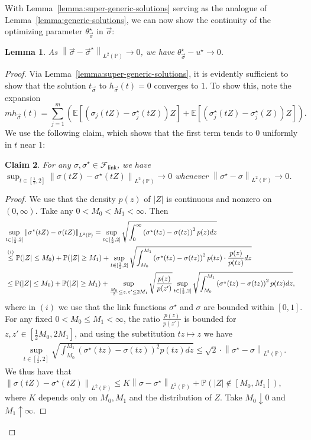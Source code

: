 \documentclass[11pt]{article}
\newcommand{\E}{\mathbb{E}}
\newcommand{\Prb}{\mathbb{P}}
\renewcommand{\P}{\mathbb{P}}
\newcommand{\prn}[1]{\left({#1}\right)} %
\newcommand{\norm}[1]{\left\|{#1}\right\|} %
\newcommand{\Flink}{\mathcal{F}_{\mathsf{link}}}
\newcommand{\<}{\langle} %
\renewcommand{\>}{\rangle}
\newcommand{\LtwoP}[1]{\norm{#1}_{L^2(\Prb)}}
\newcommand{\half}{\frac{1}{2}}
\newcommand{\opt}{^\star}
\newtheorem{claim}{Claim}[section]
\newtheorem{lemma}[claim]{Lemma}
\begin{document}
With Lemma~\ref{lemma:super-generic-solutions} serving as the analogue
of Lemma~\ref{lemma:generic-solutions}, we can now show
the continuity of the optimizing parameter $\theta\opt_{\vec{\sigma}}$
in $\vec{\sigma}$:
\begin{lemma}
	\label{lemma:vec-sigma-theta-continuity}
	As $\LtwoP{\vec{\sigma} - \vec{\sigma}\opt} \to 0$,
	we have $\theta\opt_{\vec{\sigma}} - u\opt \to 0$.
\end{lemma}
\begin{proof}
	Via Lemma~\ref{lemma:super-generic-solutions}, it is evidently
	sufficient to show that the solution $t_{\vec{\sigma}}$ to
	$h_{\vec{\sigma}}(t) = 0$ converges to $1$.
	To show this,
	note the expansion
	\begin{equation}
		\label{eqn:expand-h-m}
		m h_{\vec{\sigma}}(t) =
		\sum_{j = 1}^m \left(\E[(\sigma_j(tZ) - \sigma_j\opt(tZ)) Z]
		+ \E[(\sigma_j\opt(tZ) - \sigma_j\opt(Z))Z]
		\right).
	\end{equation}
	We use the following claim, which shows that
	the first term tends to 0 uniformly in $t$ near $1$:
	\begin{claim}
		\label{claim:taco}
		For any $\sigma, \sigma\opt \in \Flink$, we have
		$\sup_{t \in [\half,2]} \LtwoP{\sigma(tZ) - \sigma\opt(tZ)}
		\to 0$ whenever $\LtwoP{\sigma\opt - \sigma} \to 0$.
	\end{claim}
	\begin{proof}
		We use that the density $p(z)$ of $|Z|$ is continuous
		and nonzero on $(0, \infty)$. Take any $0 < M_0 < M_1 < \infty$.
		Then
		\begin{align*}
			\lefteqn{\sup_{t \in [\half, 2]}
				\LtwoP{\sigma\opt(tZ) - \sigma(tZ)}
				=  \sup_{t \in [\half, 2]} \sqrt{\int_0^\infty \prn{\sigma\opt(tz) - \sigma(tz)}^2 p(z) dz}} \\
			& \stackrel{(i)}{\leq}
			\Prb(|Z| \leq M_0) + \Prb(|Z| \geq M_1) +
			\sup_{t \in [\half, 2]} \sqrt{\int_{M_0}^{M_1}
				\prn{\sigma\opt(tz) - \sigma(tz)}^2 p(tz) \cdot
				\frac{p(z)}{p(tz)} dz} \nonumber \\
			& \leq \Prb(|Z| \leq M_0) + \Prb(|Z| \geq M_1) + \sup_{
				\frac{M_0}{2} \le z, z'
				\le 2 M_1}
			\sqrt{\frac{p(z)}{p(z')}}
			\sup_{t \in [\half, 2]} \sqrt{\int_{M_0}^{M_1}
				\prn{\sigma\opt(tz) - \sigma(tz)}^2 p(tz) dz}  ,
		\end{align*}
		where in $(i)$ we use that the link functions $\sigma\opt$ and $\sigma$
		are bounded within $[0,1]$. For any fixed $0 < M_0 \le M_1 < \infty$,
		the ratio $\frac{p(z)}{p(z')}$ is bounded
		for $z, z' \in [\half M_0, 2 M_1]$, and using
		the substitution $tz \mapsto z$ we have
		\begin{align*}
			\sup_{t \in [\half, 2]} \sqrt{
				\int_{M_0}^{M_1}
				\prn{\sigma\opt(tz) - \sigma(tz)}^2 p(tz) dz}
			\leq \sqrt{2} \cdot \LtwoP{\sigma\opt - \sigma}.
		\end{align*}
		We thus have that
		$\LtwoP{\sigma(tZ) - \sigma\opt(tZ)}
		\le K \LtwoP{\sigma - \sigma\opt}
		+ \P(|Z| \not \in [M_0, M_1])$,
		where $K$ depends only on $M_0, M_1$ and the
		distribution of $Z$.
		Take $M_0 \downarrow 0$ and $M_1 \uparrow \infty$.
	\end{proof}
	

\end{proof}
\end{document}
